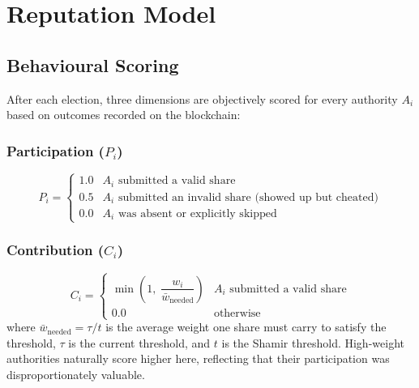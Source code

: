 \documentclass[12pt,a4paper]{article}
\theoremstyle{definition}
\theoremstyle{remark}
\begin{document}
\section{Reputation Model}
\label{sec:reputation}

\subsection{Behavioural Scoring}

After each election, three dimensions are objectively scored for every
authority $A_i$ based on outcomes recorded on the blockchain:

\subsubsection*{Participation ($P_i$)}
\begin{equation}
  P_i = \begin{cases}
    1.0 & A_i \text{ submitted a valid share} \\
    0.5 & A_i \text{ submitted an invalid share (showed up but cheated)} \\
    0.0 & A_i \text{ was absent or explicitly skipped}
  \end{cases}
\end{equation}

\subsubsection*{Contribution ($C_i$)}
\begin{equation}
  C_i = \begin{cases}
    \min\!\left(1,\; \dfrac{w_i}{\bar{w}_{\text{needed}}}\right) &
      A_i \text{ submitted a valid share} \\[8pt]
    0.0 & \text{otherwise}
  \end{cases}
\end{equation}
where $\bar{w}_{\text{needed}} = \tau / t$ is the average weight one share
must carry to satisfy the threshold, $\tau$ is the current threshold, and $t$ is
the Shamir threshold.
High-weight authorities naturally score higher here, reflecting that their
participation was disproportionately valuable.
\end{document}
